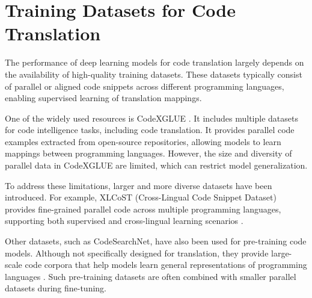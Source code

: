 \section{Training Datasets for Code Translation}

The performance of deep learning models for code translation largely depends on
the availability of high-quality training datasets. These datasets typically
consist of parallel or aligned code snippets across different programming
languages, enabling supervised learning of translation mappings.

One of the widely used resources is CodeXGLUE \cite{lu2021codexglue}. It includes
multiple datasets for code intelligence tasks, including code translation. It provides parallel code examples extracted from open-source repositories, allowing models to learn mappings between programming languages. However, the size and diversity of parallel data in CodeXGLUE are
limited, which can restrict model generalization.

To address these limitations, larger and more diverse datasets have been
introduced. For example, XLCoST (Cross-Lingual Code Snippet Dataset) provides
fine-grained parallel code across multiple programming languages, supporting
both supervised and cross-lingual learning scenarios \cite{zhu2022xlcost}.

Other datasets, such as CodeSearchNet, have also been used for pre-training
code models. Although not specifically designed for translation, they provide
large-scale code corpora that help models learn general representations of
programming languages \cite{husain2019codesearchnet}. Such pre-training datasets
are often combined with smaller parallel datasets during fine-tuning.
